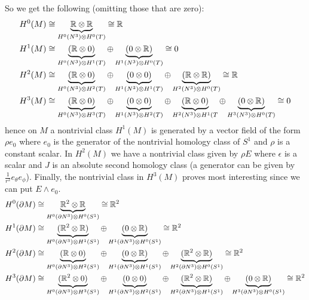 \documentclass{article}
\begin{document}
\begin{example}
\begin{itemize}
\begin{itemize}
So we get the following (omitting those that are zero):
\begin{align*}
    H^0(M) &\cong \underbrace{\mathbb{R} \otimes \mathbb{R}}_{H^0(N^3)\otimes H^0(T)} \cong \mathbb{R}\\
    H^1(M) &\cong \underbrace{(\mathbb{R} \otimes 0)}_{H^0(N^3)\otimes H^1(T)} \oplus \underbrace{(0 \otimes \mathbb{R})}_{H^1(N^3)\otimes H^0(T)} \cong 0\\
    H^2(M) &\cong \underbrace{(\mathbb{R} \otimes 0)}_{H^0(N^3)\otimes H^2(T)} \oplus \underbrace{(0 \otimes 0)}_{H^1(N^3)\otimes H^1(T)} \oplus \underbrace{(\mathbb{R} \otimes \mathbb{R})}_{H^2(N^3)\otimes H^0(T)} \cong \mathbb{R}\\
    H^3(M) &\cong \underbrace{(\mathbb{R} \otimes 0)}_{H^0(N^3)\otimes H^3(T)} \oplus \underbrace{(0 \otimes 0)}_{H^1(N^3)\otimes H^2(T)} \oplus \underbrace{(\mathbb{R} \otimes 0)}_{H^2(N^3)\otimes H^1(T} \oplus \underbrace{(0 \otimes \mathbb{R})}_{H^3(N^3)\otimes H^0(T)} \cong 0\\
\end{align*}
hence on $M$ a nontrivial class $H^1(M)$ is generated by a vector field of the form $\rho e_0$ where $e_0$ is the generator of the nontrivial homology class of $S^1$ and $\rho$ is a constant scalar. In $H^2(M)$ we have a nontrivial class given by $\rho E$ where $\epsilon$ is a scalar and $J$ is an absolute second homology class (a generator can be given by $\frac{1}{r^2}e_\theta e_\phi$). Finally, the nontrivial class in $H^3(M)$ proves most interesting since we can put $E\wedge e_0$.
\begin{align*}
    H^0(\partial M) &\cong \underbrace{\R^2 \otimes \R}_{H^0(\partial N^3)\otimes H^0(S^1)} \cong \R^2 \\
    H^1(\partial M) &\cong \underbrace{(\R^2 \otimes \R)}_{H^0(\partial N^3)\otimes H^1(S^1)} \oplus \underbrace{(0 \otimes \R)}_{H^1(\partial N^3)\otimes H^0(S^1)} \cong \R^2 \\
    H^2(\partial M) &\cong \underbrace{(\R \otimes 0)}_{H^0(\partial N^3)\otimes H^2(S^1)} \oplus \underbrace{(0 \otimes \R)}_{H^1(\partial N^3)\otimes H^1(S^1)} \oplus \underbrace{(\R^2 \otimes \R)}_{H^2(\partial N^3)\otimes H^0(S^1)} \cong \R^2\\
    H^3(\partial M) &\cong \underbrace{(\R^2 \otimes 0)}_{H^0(\partial N^3)\otimes H^3(S^1)} \oplus \underbrace{(0 \otimes 0)}_{H^1(\partial N^3)\otimes H^2(S^1)} \oplus \underbrace{(\R^2 \otimes \R)}_{H^2(\partial N^3)\otimes H^1(S^1)} \oplus \underbrace{(0 \otimes \R)}_{H^3(\partial N^3)\otimes H^0(S^1)} \cong \R^2\\

\end{align*}
\end{itemize}
\end{itemize}
\end{example}
\end{document}
